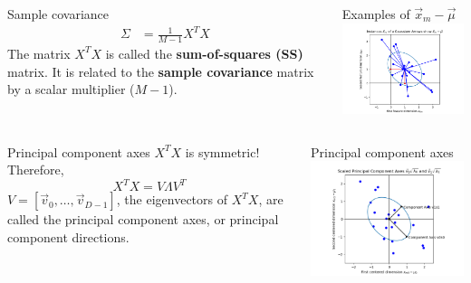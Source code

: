 \documentclass{beamer}
\begin{document}
\begin{frame}
  \begin{columns}
    \column{2.25in}
    \begin{block}{Sample covariance}
      \begin{align*}
        \Sigma&=\frac{1}{M-1}X^TX
      \end{align*}
      The matrix $X^TX$ is called the {\bf sum-of-squares (SS)} matrix.  It
      is related to the {\bf sample covariance} matrix by a scalar
      multiplier ($M-1$).
    \end{block}
    \column{2.125in}
    \begin{block}{Examples of $\vec{x}_m-\vec\mu$}
      \includegraphics[width=2.1in]{gaussian_subtraction.png}
    \end{block}
  \end{columns}
\end{frame}

\begin{frame}
  \begin{columns}
    \column{1.75in}
    \begin{block}{Principal component axes}
      $X^TX$ is symmetric!  Therefore,
      \[
      X^TX=V\Lambda V^T
      \]
      $V=[\vec{v}_0,\ldots,\vec{v}_{D-1}]$, the eigenvectors
      of $X^TX$, are called the principal component axes,
      or principal component directions.
    \end{block}
    \column{2.625in}
    \begin{block}{Principal component axes}
      \includegraphics[width=2.5in]{principal_component_axes.png}
    \end{block}
  \end{columns}
\end{frame}
\end{document}

